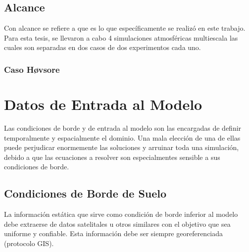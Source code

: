 \subsection{Alcance}
Con alcance se refiere a que es lo que específicamente se realizó en este trabajo. Para esta tesis, se llevaron a cabo 4 simulaciones atmosféricas multiescala las cuales son separadas en dos casos de dos experimentos cada uno.
\subsubsection{Caso Høvsore}
\section{Datos de Entrada al Modelo}
Las condiciones de borde y de entrada al modelo son las encargadas de definir temporalmente y espacialmente el dominio. Una mala elección de una de ellas puede perjudicar enormemente las soluciones y arruinar toda una simulación, debido a que las ecuaciones a resolver son especialmentes sensible a sus condiciones de borde.
\subsection{Condiciones de Borde de Suelo}
La información estática que sirve como condición de borde inferior al modelo debe extraerse de datos satelitales u otros similares con el objetivo que sea uniforme y confiable. Esta información debe ser siempre georeferenciada (protocolo GIS).

